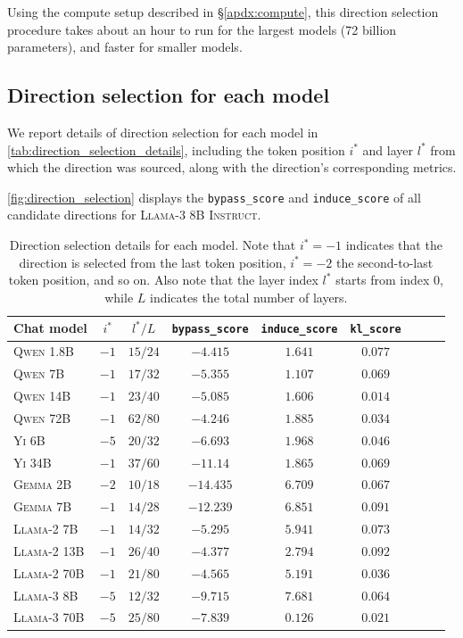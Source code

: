 \documentclass{article}
\begin{document}
Using the compute setup described in \S\ref{apdx:compute},
this direction selection procedure takes about an hour to run for the largest models (72 billion parameters), and faster for smaller models.

\subsection{Direction selection for each model}

We report details of direction selection for each model in \autoref{tab:direction_selection_details}, including the token position $i^*$ and layer $l^*$ from which the direction was sourced, along with the direction's corresponding metrics.

\autoref{fig:direction_selection} displays the \texttt{bypass\_score} and \texttt{induce\_score} of all candidate directions for \textsc{Llama-3 8B Instruct}.

\begin{table}[!h]
\caption{Direction selection details for each model. Note that $i^* = -1$ indicates that the direction is selected from the last token position, $i^* = -2$ the second-to-last token position, and so on. Also note that the layer index $l^*$ starts from index 0, while $L$ indicates the total number of layers.}
\label{tab:direction_selection_details}
\centering
\begin{tabularx}{0.85\textwidth}{l c c c c c c c c}
\toprule
Chat model & $i^*$ & $l^* / L$ & \texttt{bypass\_score} & \texttt{induce\_score} & \texttt{kl\_score} \\
\midrule
\textsc{Qwen 1.8B} & $-1$ & $15/24$ & $-4.415$ & $1.641$ & $0.077$ \\
\textsc{Qwen 7B} & $-1$ & $17/32$ & $-5.355$ & $1.107$ & $0.069$ \\
\textsc{Qwen 14B} & $-1$ & $23/40$ & $-5.085$ & $1.606$ & $0.014$ \\
\textsc{Qwen 72B} & $-1$ & $62/80$ & $-4.246$ & $1.885$ & $0.034$ \\
\textsc{Yi 6B} & $-5$ & $20/32$ & $-6.693$ & $1.968$ & $0.046$ \\
\textsc{Yi 34B} & $-1$ & $37/60$ & $-11.14$ & $1.865$ & $0.069$ \\
\textsc{Gemma 2B} & $-2$ & $10/18$ & $-14.435$ & $6.709$ & $0.067$ \\
\textsc{Gemma 7B} & $-1$ & $14/28$ & $-12.239$ & $6.851$ & $0.091$ \\
\textsc{Llama-2 7B} & $-1$ & $14/32$ & $-5.295$ & $5.941$ & $0.073$ \\
\textsc{Llama-2 13B} & $-1$ & $26/40$ & $-4.377$ & $2.794$ & $0.092$ \\
\textsc{Llama-2 70B} & $-1$ & $21/80$ & $-4.565$ & $5.191$ & $0.036$ \\
\textsc{Llama-3 8B} & $-5$ & $12/32$ & $-9.715$ & $7.681$ & $0.064$ \\
\textsc{Llama-3 70B} & $-5$ & $25/80$ & $-7.839$ & $0.126$ & $0.021$ \\
\bottomrule
\end{tabularx}
\end{table}
\end{document}
